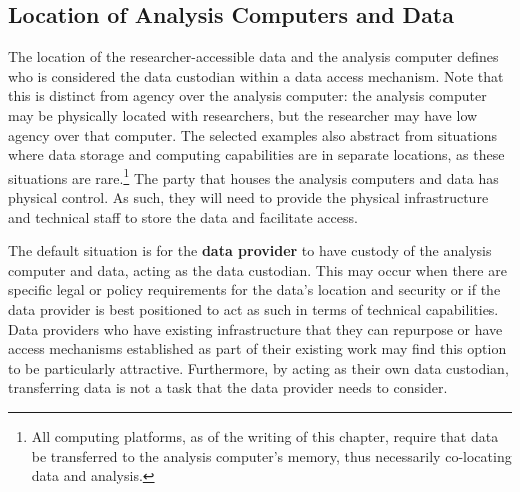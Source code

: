 \hypertarget{location-of-analysis-computers-and-data}{%
\subsection{Location of Analysis Computers and Data}\label{location-of-analysis-computers-and-data}}

The location of the researcher-accessible data and the analysis computer defines who is considered the data custodian within a data access mechanism. Note that this is distinct from agency over the analysis computer: the analysis computer may be physically located with researchers, but the researcher may have low agency over that computer. The selected examples also abstract from situations where data storage and computing capabilities are in separate locations, as these situations are rare.\footnote{All computing platforms, as of the writing of this chapter, require that data be transferred to the analysis computer's memory, thus necessarily co-locating data and analysis.} The party that houses the analysis computers and data has physical control. As such, they will need to provide the physical infrastructure and technical staff to store the data and facilitate access.

The default situation is for the \textbf{data provider} to have custody of the analysis computer and data, acting as the data custodian. This may occur when there are specific legal or policy requirements for the data's location and security or if the data provider is best positioned to act as such in terms of technical capabilities. Data providers who have existing infrastructure that they can repurpose or have access mechanisms established as part of their existing work may find this option to be particularly attractive. Furthermore, by acting as their own data custodian, transferring data is not a task that the data provider needs to consider.

